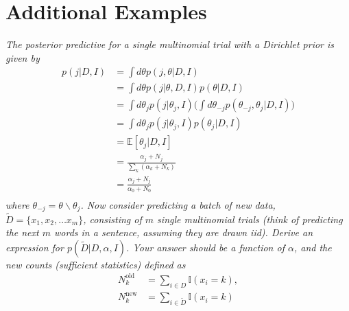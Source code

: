 \chapter{Additional Examples}





\begin{example}
	\label{ex:313}
	\emph{The posterior predictive for a single multinomial trial with a Dirichlet prior is given by}
	\begin{equation}
		\begin{split}
			p(j|D,I) &= \int d\theta p(j,\theta|D,I)\\
			&= \int d\theta p(j|\theta,D,I)p(\theta|D,I)\\
			&= \int d\theta_j p(j|\theta_j,I)\bigg(\int d\theta_{-j} p(\theta_{-j},\theta_j|D,I)\bigg)\\
			&= \int d\theta_j p(j|\theta_j,I)p(\theta_j|D,I)\\
			& = \mathbb{E}[\theta_j|D,I]\\
			& = \frac{\alpha_{j}+N_j}{\sum_k(\alpha_k+N_k)}\\
			& = \frac{\alpha_{j}+N_j}{\alpha_0+N_0}\\
		\end{split}
	\end{equation}
	\emph{where $\theta_{-j}= \theta \backslash \theta_j$. Now consider predicting a batch of new data, $\tilde{D}=\{x_1,x_2,\dots x_m\}$, consisting of $m$ single multinomial trials (think of predicting the next $m$ words in a sentence, assuming they are drawn iid). Derive an expression for $p(\tilde{D}|D,\alpha,I)$. Your answer should be a function of $\alpha$, and the new counts (sufficient statistics) defined as}
	\begin{equation}
		\begin{split}
			N_k^{\text{old}} & = \sum_{i\in D} \mathbb{I}(x_i=k),\\
			N_k^{\text{new}} & = \sum_{i\in \tilde{D}} \mathbb{I}(x_i=k)\\
		\end{split}
	\end{equation}
	

\end{example}
